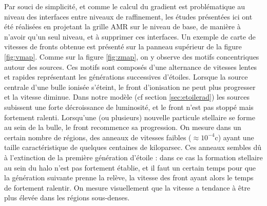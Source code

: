Par souci de simplicité, et comme le calcul du gradient est problématique au niveau des interfaces entre niveaux de raffinement, les études présentées ici ont été réalisées en projetant la grille \ac{AMR} sur le niveau de base, de manière à n'avoir qu'un seul niveau, et à supprimer ces interfaces.
Un exemple de carte de vitesses de fronts obtenue est présenté sur la panneau supérieur de la figure \ref{fig:vmap}.
Comme sur la figure \ref{fig:zmap}, on y observe des motifs concentriques autour des sources.
Ces motifs sont composés d'une alternance de vitesses lentes et rapides représentant les générations successives d'étoiles.
Lorsque la source centrale d'une bulle ionisée s’éteint, le front d'ionisation ne peut plus progresser et la vitesse diminue.
Dans notre modèle (cf section \ref{sec:etoilerad}) les sources subissent une forte décroissance de luminosité, et le front n'est pas stoppé mais fortement ralenti.
Lorsqu'une (ou plusieurs) nouvelle particule stellaire se forme au sein de la bulle, le front recommence sa progression.
On mesure dans un certain nombre de régions, des anneaux de vitesses faibles ($\approx 10^{-4}$c) ayant une taille caractéristique de quelques centaines de kiloparsec.
Ces anneaux sembles dû à l'extinction de la première génération d'étoile : dans ce cas la formation stellaire au sein du halo n'est pas fortement établie, et il faut un certain temps pour que la génération suivante prenne la relève, la vitesse des front ayant alors le temps de fortement ralentir.
On mesure visuellement que la vitesse a tendance à être plus élevée dans les régions sous-denses.

